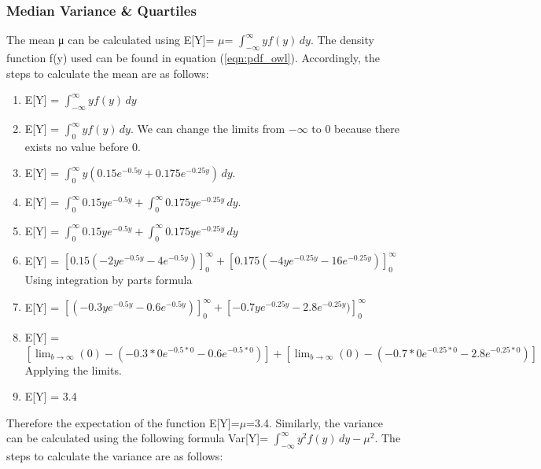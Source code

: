 \subsubsection{Median Variance \& Quartiles}    

The mean μ can be calculated using E[Y]= $\mu$= $\int_{-\infty}^{\infty} yf(y)\,dy$. The density function f(y) used can be found in equation (\ref{eqn:pdf_owl}). Accordingly, the steps to calculate the mean are as follows: 

\begin{enumerate}
    \item E[Y] = $\int_{-\infty}^{\infty} yf(y)\,dy$
    \item E[Y] = $\int_{0}^{\infty} yf(y)\,dy$.  We can change the limits from $-\infty$ to 0 because there exists no value before 0.
    \item E[Y] = $\int_{0}^{\infty} y(0.15e^{-0.5y} + 0.175e^{-0.25y})\,dy$.
    \item E[Y] = $\int_{0}^{\infty} 0.15ye^{-0.5y} + \int_{0}^{\infty} 0.175ye^{-0.25y}\,dy$.
    \item E[Y] = $\int_{0}^{\infty} 0.15ye^{-0.5y} + \int_{0}^{\infty} 0.175ye^{-0.25y}\,dy$ \label{eqn:mean_line_5}
    \item E[Y] = $[0.15(-2ye^{-0.5y}-4e^{-0.5y})]_0^\infty + [0.175(-4ye^{-0.25y}-16e^{-0.25y})]_0^\infty$ Using integration by parts formula
    \item E[Y] = $[(-0.3ye^{-0.5y}-0.6e^{-0.5y})]_0^\infty + [-0.7ye^{-0.25y}-2.8e^{-0.25y})]_0^\infty$
    \item E[Y] = $[\lim_{b\to\infty}(0)-(-0.3*0e^{-0.5*0}-0.6e^{-0.5*0})] + [\lim_{b\to\infty}(0)-(-0.7*0e^{-0.25*0}-2.8e^{-0.25*0})]$ Applying the limits.
    \item E[Y] = 3.4
\end{enumerate}
Therefore the expectation of the function E[Y]=$\mu$=3.4. Similarly, the variance can be calculated using the following formula Var[Y]= $\int_{-\infty}^{\infty}y^2f(y)\,dy - \mu^2$. The steps to calculate the variance are as follows: 


